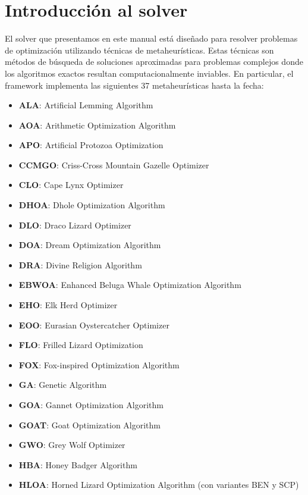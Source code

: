 \section{Introducción al solver}

El solver que presentamos en este manual está diseñado para resolver problemas de optimización utilizando técnicas de metaheurísticas. Estas técnicas son métodos de búsqueda de soluciones aproximadas para problemas complejos donde los algoritmos exactos resultan computacionalmente inviables. En particular, el framework implementa las siguientes 37 metaheurísticas hasta la fecha:

\begin{itemize}
    \item \textbf{ALA}: Artificial Lemming Algorithm
    \item \textbf{AOA}: Arithmetic Optimization Algorithm
    \item \textbf{APO}: Artificial Protozoa Optimization
    \item \textbf{CCMGO}: Criss-Cross Mountain Gazelle Optimizer
    \item \textbf{CLO}: Cape Lynx Optimizer
    \item \textbf{DHOA}: Dhole Optimization Algorithm
    \item \textbf{DLO}: Draco Lizard Optimizer
    \item \textbf{DOA}: Dream Optimization Algorithm
    \item \textbf{DRA}: Divine Religion Algorithm
    \item \textbf{EBWOA}: Enhanced Beluga Whale Optimization Algorithm
    \item \textbf{EHO}: Elk Herd Optimizer
    \item \textbf{EOO}: Eurasian Oystercatcher Optimizer
    \item \textbf{FLO}: Frilled Lizard Optimization
    \item \textbf{FOX}: Fox-inspired Optimization Algorithm
    \item \textbf{GA}: Genetic Algorithm
    \item \textbf{GOA}: Gannet Optimization Algorithm
    \item \textbf{GOAT}: Goat Optimization Algorithm
    \item \textbf{GWO}: Grey Wolf Optimizer
    \item \textbf{HBA}: Honey Badger Algorithm
    \item \textbf{HLOA}: Horned Lizard Optimization Algorithm (con variantes BEN y SCP)

\end{itemize}
